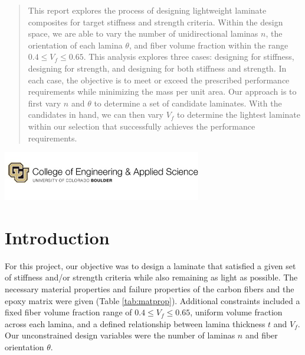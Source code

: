 \documentclass[12pt]{article}
\begin{document}
\begin{titlepage}
\begin{abstract}
This report explores the process of designing lightweight laminate composites for target stiffness and strength criteria. Within the design space, we are able to vary the number of unidirectional laminas $n$, the orientation of each lamina $\theta$, and fiber volume fraction within the range $0.4\leq V_f\leq0.65$. This analysis explores three cases: designing for stiffness, designing for strength, and designing for both stiffness and strength. In each case, the objective is to meet or exceed the prescribed performance requirements while minimizing the mass per unit area. Our approach is to first vary $n$ and $\theta$ to determine a set of candidate laminates. With the candidates in hand, we can then vary $V_f$ to determine the lightest laminate within our selection that successfully achieves the performance requirements. 
\end{abstract}



\vfill

\includegraphics[width=0.65\textwidth]{CU_Engineering (1).jpg}
\end{titlepage}

\section{Introduction}
For this project, our objective was to design a laminate that satisfied a given set of stiffness and/or strength criteria while also remaining as light as possible. The necessary material properties and failure properties of the carbon fibers and the epoxy matrix were given (Table \ref{tab:matprop}). Additional constraints included a fixed fiber volume fraction range of $0.4\leq V_f\leq0.65$, uniform volume fraction across each lamina, and a defined relationship between lamina thickness $t$ and $V_f$. Our unconstrained design variables were the number of laminas $n$ and fiber orientation $\theta$. 
\end{document}
